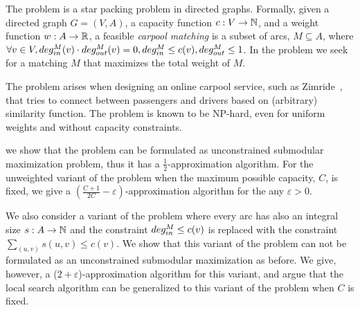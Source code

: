 The \textsc{\CARPOOL{}} problem is a star packing problem in directed graphs.
Formally, given a directed graph $G = (V, A)$,
a capacity function $c: V \rightarrow \N$,
and a weight function $w : A \rightarrow \R $,
a feasible \emph{carpool matching} is a subset of arcs, 
$M \subseteq A$, where
$\forall v \in V, 
\din[M](v) \cdot \dout[M](v) = 0, 
\din[M] \leq c(v),
\dout[M] \leq 1$. 
In the \textsc{\CARPOOL{}} problem we seek for a matching $M$
that maximizes the total weight of $M$.

The problem arises when designing an online carpool service, 
such as Zimride~\cite{zimride}, 
that tries to connect between passengers and drivers based on (arbitrary) similarity function.
The problem is known to be NP-hard, 
even for uniform weights and without capacity constraints.

we show that the problem can be formulated as
unconstrained submodular maximization problem, 
thus it has a $\frac{1}{2}$-approximation algorithm.
For the unweighted variant of the problem when the maximum possible capacity, $C$, is
fixed, we give a $(\frac{C + 1}{2C} - \varepsilon)$-approximation algorithm
for the any $\varepsilon > 0$.

We also consider a variant of the \textsc{\CARPOOL{}} problem where every arc
has also an integral size $s:A \to \N$ and the constraint $\din[M] \leq c(v)$
is replaced with the constraint $\sum_{(u,v)}s(u,v) \leq c(v)$.
We show that this variant of the problem can not be formulated as an
unconstrained submodular maximization as before.
We give, however, a ($2 + \varepsilon$)-approximation algorithm for this
variant, and argue that the local search algorithm can be generalized to this
variant of the problem when $C$ is fixed.
